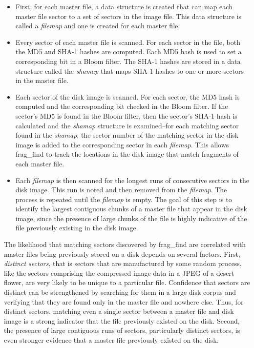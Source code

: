 \begin{itemize}

\item First, for each master file, a data structure is created that can map each master file sector to a set of sectors in the image file. This data structure is called a \emph{filemap} and one is created for each master 
file.

\item Every sector of each master file is scanned. For each sector in the file, both the MD5 and SHA-1 hashes are computed. Each MD5 hash is used to set a corresponding bit in a Bloom filter. The
SHA-1 hashes are stored in a data structure called the \emph{shamap} that maps SHA-1 hashes to one or more sectors in the master file.  

\item Each sector of the disk image is scanned. For each sector, the MD5 hash is computed and the corresponding bit checked in the Bloom filter.  If the sector’s MD5 is found in the Bloom filter, then 
the sector’s SHA-1 hash is calculated and the \emph{shamap} structure is examined--for each matching sector found in the \emph{shamap}, the sector number of the matching sector in the disk image is added to the corresponding sector in each \emph{filemap}.  This allows frag\_find to track the locations in the disk image that match fragments of each master file. 

\item Each \emph{filemap} is then scanned for the longest runs of consecutive sectors in the disk image.    This run is noted and then removed from the \emph{filemap}. The process is repeated until the \emph{filemap} is empty.  The goal of this step is to identify the largest contiguous chunks of a master file that appear in the disk image, since the presence of large chunks of the file is highly indicative of the file previously existing in the disk image.

\end{itemize}

The likelihood that matching sectors discovered by frag\_find are correlated with master files being  previously stored on a disk depends on several factors.  First, \emph{distinct sectors}, that is sectors that are manufactured by some random process, like the sectors comprising the compressed image data in a JPEG of a desert flower, are very likely to be unique to a particular file. Confidence that sectors are distinct can be strengthened by searching for them in a large disk corpus and verifying that they are found only in the master file and nowhere else.  Thus, for distinct sectors, matching even a single sector between a master file and disk image is a strong indicator that the file previously existed on the disk.  Second, the presence of large contiguous runs of sectors, particularly distinct sectors, is even stronger evidence that a master file previously existed on the disk.


